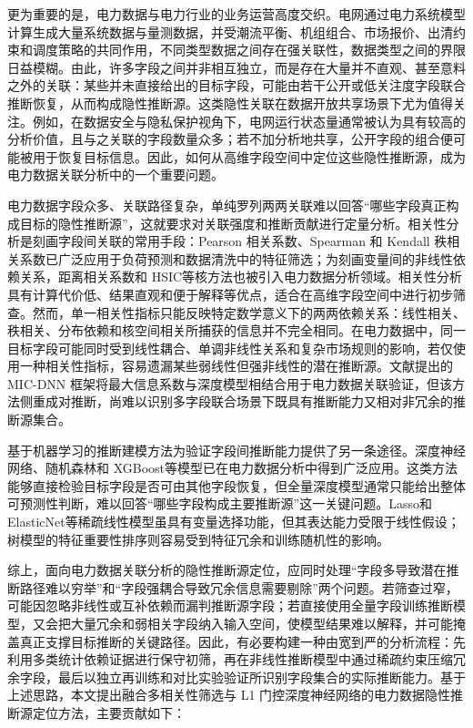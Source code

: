 \documentclass[UTF8,zihao=5,twoside]{ctexart}
\numberwithin{equation}{section}
\begin{document}
更为重要的是，电力数据与电力行业的业务运营高度交织。电网通过电力系统模型计算生成大量系统数据与量测数据，并受潮流平衡、机组组合、市场报价、出清约束和调度策略的共同作用，不同类型数据之间存在强关联性，数据类型之间的界限日益模糊\cite{ref-xing-micdnn}。由此，许多字段之间并非相互独立，而是存在大量并不直观、甚至意料之外的关联：某些并未直接给出的目标字段，可能由若干公开或低关注度字段联合推断恢复，从而构成隐性推断源。这类隐性关联在数据开放共享场景下尤为值得关注。例如，在数据安全与隐私保护视角下，电网运行状态量通常被认为具有较高的分析价值，且与之关联的字段数量众多；若不加分析地共享，公开字段的组合便可能被用于恢复目标信息\cite{ref-sankar,ref-giaconi}。因此，如何从高维字段空间中定位这些隐性推断源，成为电力数据关联分析中的一个重要问题。

电力数据字段众多、关联路径复杂，单纯罗列两两关联难以回答“哪些字段真正构成目标的隐性推断源”，这就要求对关联强度和推断贡献进行定量分析。相关性分析是刻画字段间关联的常用手段：Pearson 相关系数、Spearman 和 Kendall 秩相关系数已广泛应用于负荷预测和数据清洗中的特征筛选\cite{ref-lan-load,ref-jiao-pv,ref-deng-load}；为刻画变量间的非线性依赖关系，距离相关系数\cite{ref-szekely-dcorr}和 HSIC\cite{ref-gretton-hsic}等核方法也被引入电力数据分析领域。相关性分析具有计算代价低、结果直观和便于解释等优点，适合在高维字段空间中进行初步筛查。然而，单一相关性指标只能反映特定数学意义下的两两依赖关系：线性相关、秩相关、分布依赖和核空间相关所捕获的信息并不完全相同。在电力数据中，同一目标字段可能同时受到线性耦合、单调非线性关系和复杂市场规则的影响，若仅使用一种相关性指标，容易遗漏某些弱线性但强非线性的潜在推断源。文献\cite{ref-xing-micdnn}提出的 MIC-DNN 框架将最大信息系数与深度模型相结合用于电力数据关联验证，但该方法侧重成对推断，尚难以识别多字段联合场景下既具有推断能力又相对非冗余的推断源集合。

基于机器学习的推断建模方法为验证字段间推断能力提供了另一条途径。深度神经网络、随机森林\cite{ref-breiman-rf}和 XGBoost\cite{ref-chen-xgboost}等模型已在电力数据分析中得到广泛应用\cite{ref-wang-meter}。这类方法能够直接检验目标字段是否可由其他字段恢复，但全量深度模型通常只能给出整体可预测性判断，难以回答“哪些字段构成主要推断源”这一关键问题。Lasso\cite{ref-tibshirani-lasso}和 ElasticNet\cite{ref-zou-enet}等稀疏线性模型虽具有变量选择功能，但其表达能力受限于线性假设；树模型的特征重要性排序则容易受到特征冗余和训练随机性的影响。

综上，面向电力数据关联分析的隐性推断源定位，应同时处理“字段多导致潜在推断路径难以穷举”和“字段强耦合导致冗余信息需要剔除”两个问题。若筛查过窄，可能因忽略非线性或互补依赖而漏判推断源字段；若直接使用全量字段训练推断模型，又会把大量冗余和弱相关字段纳入输入空间，使模型结果难以解释，并可能掩盖真正支撑目标推断的关键路径。因此，有必要构建一种由宽到严的分析流程：先利用多类统计依赖证据进行保守初筛，再在非线性推断模型中通过稀疏约束压缩冗余字段，最后以独立再训练和对比实验验证所识别字段集合的实际推断能力。基于上述思路，本文提出融合多相关性筛选与 L1 门控深度神经网络的电力数据隐性推断源定位方法，主要贡献如下：
\end{document}
